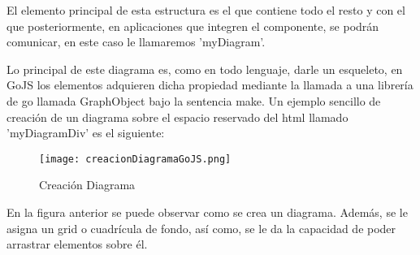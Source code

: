 \vspace{5mm}

El elemento principal de esta estructura es el que contiene todo el resto y con el que posteriormente, en aplicaciones que integren el componente, se podrán comunicar, en este caso le llamaremos 'myDiagram'.

Lo principal de este diagrama es, como en todo lenguaje, darle un esqueleto, en GoJS los elementos adquieren dicha propiedad mediante la llamada a una librería de go llamada GraphObject bajo la sentencia make. Un ejemplo sencillo de creación de un diagrama sobre el espacio reservado del html llamado 'myDiagramDiv' es el siguiente:

\vspace{5mm}

\begin{figure}[H]
	\centering
	\texttt{[image: creacionDiagramaGoJS.png]}
	\caption{Creación Diagrama}\label{fig:creacionDiagramaGoJS}
\end{figure}

\vspace{5mm}
En la figura anterior se puede observar como se crea un diagrama. Además, se le asigna un grid o cuadrícula de fondo, así como, se le da la capacidad de poder arrastrar elementos sobre él.



\vspace{5mm}